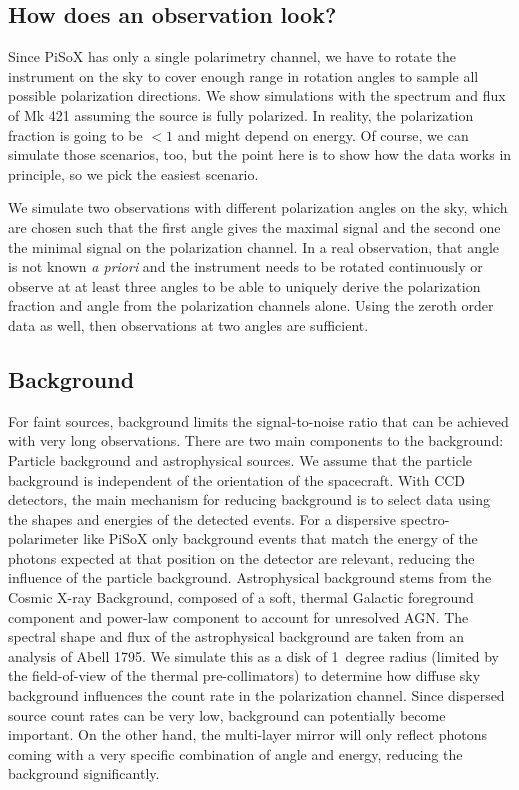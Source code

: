 \documentclass[]{spie}  %
\begin{document}
\subsection{How does an observation look?}
Since PiSoX has only a single polarimetry channel, we have to rotate
the instrument on the sky to cover enough range in rotation angles to
sample all possible polarization directions. We show simulations with
the spectrum and flux of Mk 421 assuming the source is fully
polarized. In reality, the polarization fraction is going to be $<1$
and might depend on energy. Of course, we can simulate those
scenarios, too, but the point here is to show how the data works in
principle, so we pick the easiest scenario.

We simulate two observations with different polarization angles on the
sky, which are chosen such that the first angle gives the maximal
signal and the second one the minimal signal on the polarization
channel. In a real observation, that angle is not known {\it a priori} and
the instrument needs to be rotated continuously or observe at at least
three angles to be able to uniquely derive the polarization fraction
and angle from the polarization channels alone. Using the zeroth order
data as well, then observations at two angles are sufficient.

\subsection{Background}
For faint sources, background limits the signal-to-noise ratio that
can be achieved with very long observations. There are two main
components to the background: Particle background and astrophysical
sources. We assume that the particle background is
independent of the orientation of
the spacecraft.
With CCD detectors, the main mechanism for reducing background
is to select data using the
shapes and energies of the detected events. For a
dispersive spectro-polarimeter like
PiSoX only background events that match the energy of the photons
expected at that position on the detector are relevant, reducing the
influence of the particle background. Astrophysical background stems
from the Cosmic X-ray Background, composed of a soft, thermal Galactic
foreground component and power-law component to account for unresolved
AGN. The spectral shape and flux of the astrophysical
background are taken from an analysis of Abell
1795\cite{2009PASJ...61.1117B}.  We simulate this as a disk of
1~degree radius (limited by the field-of-view of the thermal
pre-collimators) to determine how diffuse sky background influences
the count rate in the polarization channel. Since
dispersed source count rates can be very low, background can
potentially become important. On the other hand, the multi-layer
mirror will only reflect photons coming with a very specific
combination of angle and energy, reducing the background
significantly.
\end{document}
